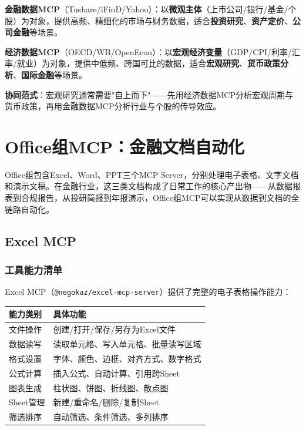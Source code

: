 \begin{theorybox}
\textbf{金融数据MCP}（Tushare/iFinD/Yahoo）：以\textbf{微观主体}（上市公司/银行/基金/个股）为对象，提供高频、精细化的市场与财务数据，适合\textbf{投资研究}、\textbf{资产定价}、\textbf{公司金融}等场景。

\textbf{经济数据MCP}（OECD/WB/OpenEcon）：以\textbf{宏观经济变量}（GDP/CPI/利率/汇率/就业）为对象，提供中低频、跨国可比的数据，适合\textbf{宏观研究}、\textbf{货币政策分析}、\textbf{国际金融}等场景。

\textbf{协同范式}：宏观研究通常需要"自上而下"——先用经济数据MCP分析宏观周期与货币政策，再用金融数据MCP分析行业与个股的传导效应。
\end{theorybox}

\section{Office组MCP：金融文档自动化}

Office组包含Excel、Word、PPT三个MCP Server，分别处理电子表格、文字文档和演示文稿。在金融行业，这三类文档构成了日常工作的核心产出物——从数据报表到合规报告，从投研简报到年报演示，Office组MCP可以实现从数据到文档的全链路自动化。

\subsection{Excel MCP}

\subsubsection{工具能力清单}

Excel MCP（\texttt{@negokaz/excel-mcp-server}）提供了完整的电子表格操作能力：

\begin{table}[H]
\centering
\begin{tabular}{lp{9cm}}
\toprule
\textbf{能力类别} & \textbf{具体功能} \\
\midrule
文件操作 & 创建/打开/保存/另存为Excel文件 \\
数据读写 & 读取单元格、写入单元格、批量读写区域 \\
格式设置 & 字体、颜色、边框、对齐方式、数字格式 \\
公式计算 & 插入公式、自动计算、引用跨Sheet \\
图表生成 & 柱状图、饼图、折线图、散点图 \\
Sheet管理 & 新建/重命名/删除/复制Sheet \\
筛选排序 & 自动筛选、条件筛选、多列排序 \\
\bottomrule
\end{tabular}
\end{table}

